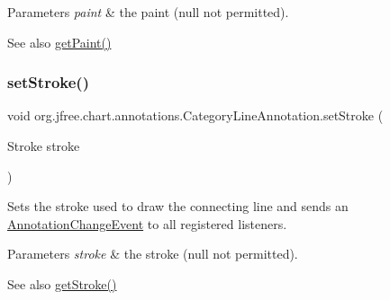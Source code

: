 \begin{DoxyParams}{Parameters}
{\em paint} & the paint ({\ttfamily null} not permitted).\\
\hline
\end{DoxyParams}
\begin{DoxySeeAlso}{See also}
\mbox{\hyperlink{classorg_1_1jfree_1_1chart_1_1annotations_1_1_category_line_annotation_a47cb5c29bbf096219ba83972083ca987}{get\+Paint()}} 
\end{DoxySeeAlso}
\mbox{\label{classorg_1_1jfree_1_1chart_1_1annotations_1_1_category_line_annotation_a0f78238a070be985783f23037603b14e}} 
\subsubsection{\texorpdfstring{set\+Stroke()}{setStroke()}}
{\footnotesize\ttfamily void org.\+jfree.\+chart.\+annotations.\+Category\+Line\+Annotation.\+set\+Stroke (\begin{DoxyParamCaption}\item[{Stroke}]{stroke }\end{DoxyParamCaption})}

Sets the stroke used to draw the connecting line and sends an \mbox{\hyperlink{}{Annotation\+Change\+Event}} to all registered listeners.


\begin{DoxyParams}{Parameters}
{\em stroke} & the stroke ({\ttfamily null} not permitted).\\
\hline
\end{DoxyParams}
\begin{DoxySeeAlso}{See also}
\mbox{\hyperlink{classorg_1_1jfree_1_1chart_1_1annotations_1_1_category_line_annotation_a3911b0d648b52e13cf946df090854aee}{get\+Stroke()}} 
\end{DoxySeeAlso}
\mbox{\label{classorg_1_1jfree_1_1chart_1_1annotations_1_1_category_line_annotation_a781fe86987bd6b0b714f52385eeea200}} 
